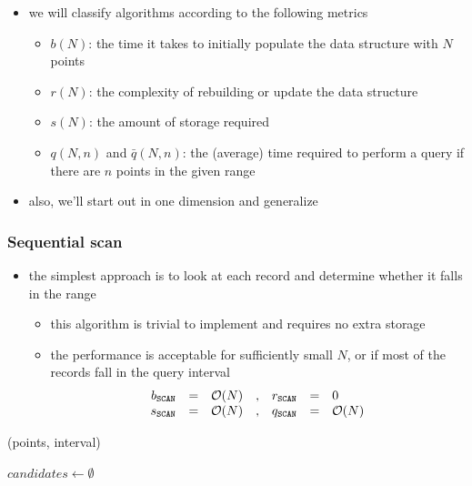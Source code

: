 \begin{frame}[fragile]
\begin{itemize}
%
  \item we will classify algorithms according to the following metrics
    \begin{itemize}
    \item $b(N)$: the time it takes to initially populate the data structure with $N$ points
    \item $r(N)$: the complexity of rebuilding or update the data structure
    \item $s(N)$: the amount of storage required
    \item $q(N,n)$ and $\bar{q}(N,n)$: the (average) time required to perform a query if
      there are $n$ points in the given range
    \end{itemize}
%
  \item also, we'll start out in one dimension and generalize
%
  \end{itemize}
%
\end{frame}

\begin{frame}[fragile]
%
  \frametitle{Sequential scan}
%
  \begin{itemize}
%
  \item the simplest approach is to look at each record and determine whether it falls in the
    range
    \begin{itemize}
    \item this algorithm is trivial to implement and requires no extra storage
    \item the performance is acceptable for sufficiently small $N$, or if most of the records
      fall in the query interval
      \begin{equation*}
        \begin{array}{rclcrcl}
          b_{{\tt SCAN}} & = & \mbox{$\mathcal{O}(N)$} &, &
          r_{{\tt SCAN}} & = & 0  \\
          s_{{\tt SCAN}} & = & \mbox{$\mathcal{O}(N)$} &, &
          q_{{\tt SCAN}} & = & \mbox{$\mathcal{O}(N)$}
        \end{array}
      \end{equation*}
    \end{itemize}
%
  \end{itemize}
%
  \begin{center}
    \begin{minipage}{.85\linewidth}
      \begin{algorithm}[H]
        \label{alg:rq-scan}
%
        \dontprintsemicolon
        \setalcaphskip{0ex}
%
        \caption{\rqscan(points, interval)}
%
        $candidates \leftarrow \emptyset$ \;
%
      \end{algorithm}
    \end{minipage}
  \end{center}
%
\end{frame}


